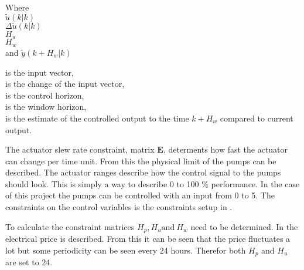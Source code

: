  \begin{minipage}[t]{0.20\textwidth}
 Where\\
 \hspace*{8mm} $\tilde u(k|k)$ \\
 \hspace*{8mm} $\Delta\tilde u(k|k)$ \\
 \hspace*{8mm} $H_u$ \\
 \hspace*{8mm} $H_w$ \\
 and \hspace*{0.7mm} $\tilde y(k+H_w|k)$	
 \end{minipage}
 \begin{minipage}[t]{0.68\textwidth}
 \vspace*{2mm}
 is the input vector, \\
 is the change of the input vector, \\
 is the control horizon, \\
 is the window horizon, \\
 is the estimate of the controlled output to the time $k+H_w$ compared to current output.
 \end{minipage}

The actuator slew rate constraint, matrix $\pmb{E}$, determents how fast the actuator can change per time unit. From this the physical limit of the pumps can be described. The actuator ranges describe how the control signal to the pumps should look. This is simply a way to describe 0 to 100 \% performance. In the case of this project the pumps can be controlled with an input from 0 to 5. The constraints on the control variables is the constraints setup in . 



To calculate the constraint matrices $H_p, H_u \text{and} \: H_w$ need to be determined. In  the electrical price is described. From this it can be seen that the price fluctuates a lot but some periodicity can be seen every 24 hours. Therefor both $H_p$ and $ H_u $ are set to 24. 





